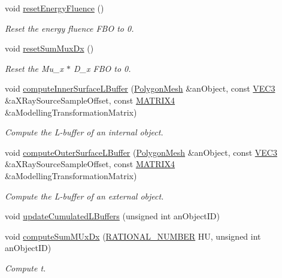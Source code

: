 \begin{DoxyCompactItemize}
void \hyperlink{classg_virtual_x_ray_1_1_x_ray_renderer_aed59e8c837471d013e5b5ea006881465}{resetEnergyFluence} ()
\begin{DoxyCompactList}\small\item\em Reset the energy fluence FBO to 0. \end{DoxyCompactList}\item 
void \hyperlink{classg_virtual_x_ray_1_1_x_ray_renderer_a9687410867e38b6d5140678b0a16c146}{resetSumMuxDx} ()
\begin{DoxyCompactList}\small\item\em Reset the Mu\_\-x $\ast$ D\_\-x FBO to 0. \end{DoxyCompactList}\item 
void \hyperlink{classg_virtual_x_ray_1_1_x_ray_renderer_aa9d6223020b229b98ba7a57eb15ec306}{computeInnerSurfaceLBuffer} (\hyperlink{class_graphics_1_1_polygon_mesh}{PolygonMesh} \&anObject, const \hyperlink{class_math_1_1_vec3}{VEC3} \&aXRaySourceSampleOffset, const \hyperlink{class_math_1_1_matrix4x4}{MATRIX4} \&aModellingTransformationMatrix)
\begin{DoxyCompactList}\small\item\em Compute the L-\/buffer of an internal object. \end{DoxyCompactList}\item 
void \hyperlink{classg_virtual_x_ray_1_1_x_ray_renderer_acb29e82c18bd5e87359301e4557aefb8}{computeOuterSurfaceLBuffer} (\hyperlink{class_graphics_1_1_polygon_mesh}{PolygonMesh} \&anObject, const \hyperlink{class_math_1_1_vec3}{VEC3} \&aXRaySourceSampleOffset, const \hyperlink{class_math_1_1_matrix4x4}{MATRIX4} \&aModellingTransformationMatrix)
\begin{DoxyCompactList}\small\item\em Compute the L-\/buffer of an external object. \end{DoxyCompactList}\item 
void \hyperlink{classg_virtual_x_ray_1_1_x_ray_renderer_a30af82b3a10279690ab2b395e6c812a6}{updateCumulatedLBuffers} (unsigned int anObjectID)
\item 
void \hyperlink{classg_virtual_x_ray_1_1_x_ray_renderer_a3190cdb7948bd2e446e44da82c39d7b1}{computeSumMUxDx} (\hyperlink{namespace_utilities_a40969b96bd8d847b962e297cb79f08ce}{RATIONAL\_\-NUMBER} HU, unsigned int anObjectID)
\begin{DoxyCompactList}\small\item\em Compute t. \end{DoxyCompactList}\item 

\end{DoxyCompactItemize}
